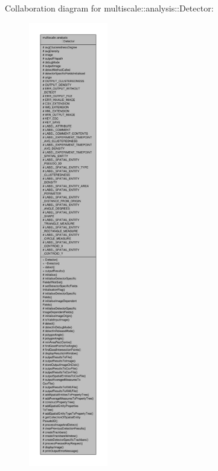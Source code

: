 Collaboration diagram for multiscale\-:\-:analysis\-:\-:Detector\-:\nopagebreak
\begin{figure}[H]
\begin{center}
\leavevmode
\includegraphics[height=550pt]{classmultiscale_1_1analysis_1_1Detector__coll__graph}
\end{center}
\end{figure}
